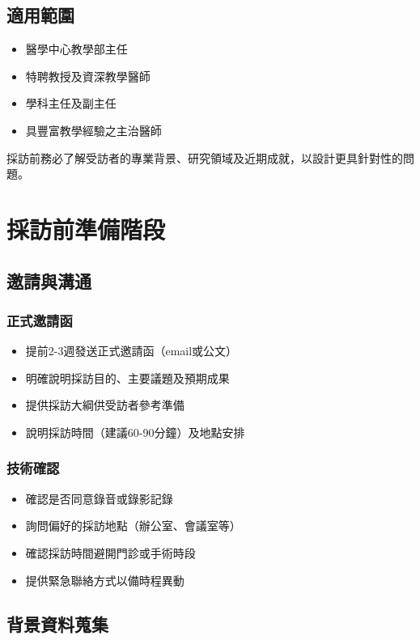 \documentclass[12pt,a4paper]{article}
\newcommand{\note}[1]{
    \par
    \noindent
    \begin{tcolorbox}[
        colback=interview_blue!5!white,
        colframe=interview_blue,
        title=\textbf{重點提醒},
        fonttitle=\bfseries,
        boxrule=0.5pt,
        arc=3pt,
        left=6pt,
        right=6pt,
        top=6pt,
        bottom=6pt
    ]
    #1
    \end{tcolorbox}
}
\begin{document}
\subsection{適用範圍}
\begin{itemize}[nosep]
    \item 醫學中心教學部主任
    \item 特聘教授及資深教學醫師
    \item 學科主任及副主任
    \item 具豐富教學經驗之主治醫師
\end{itemize}

\vspace{0.5cm}
\note{
採訪前務必了解受訪者的專業背景、研究領域及近期成就，以設計更具針對性的問題。
}

\section{採訪前準備階段}

\subsection{邀請與溝通}
\subsubsection{正式邀請函}
\begin{itemize}[nosep]
    \item 提前2-3週發送正式邀請函（email或公文）
    \item 明確說明採訪目的、主要議題及預期成果
    \item 提供採訪大綱供受訪者參考準備
    \item 說明採訪時間（建議60-90分鐘）及地點安排
\end{itemize}

\subsubsection{技術確認}
\begin{itemize}[nosep]
    \item 確認是否同意錄音或錄影記錄
    \item 詢問偏好的採訪地點（辦公室、會議室等）
    \item 確認採訪時間避開門診或手術時段
    \item 提供緊急聯絡方式以備時程異動
\end{itemize}

\subsection{背景資料蒐集}
\end{document}
